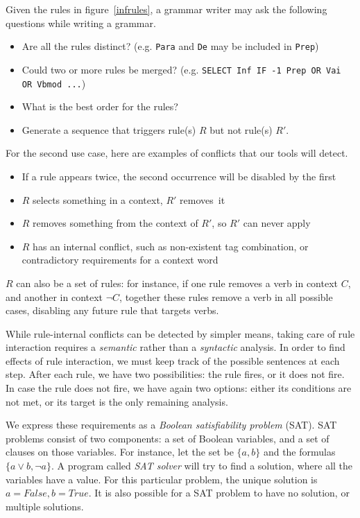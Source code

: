 Given the rules in figure~\ref{infrules}, a grammar writer may ask the following questions while writing a grammar. 

\begin{itemize}
\item Are all the rules distinct? (e.g. \texttt{Para} and \texttt{De} may be included in \texttt{Prep})
\item Could two or more rules be merged? (e.g. \texttt{SELECT Inf IF -1 Prep OR Vai OR Vbmod ...})
\item What is the best order for the rules?
\item Generate a sequence that triggers rule(s) $R$ but not rule(s) $R'$. 
\end{itemize}


For the second use case, here are examples of conflicts that our tools will detect.
\begin{itemize}
\item If a rule appears twice, the second occurrence will be disabled by the first
\item $R$ selects something in a context, $R'$ removes~it
\item $R$ removes something from the context of $R'$, so $R'$ can never
  apply
\item $R$ has an internal conflict, such as non-existent
tag combination, or contradictory requirements for a context word
\end{itemize}
$R$ can also be a set of rules: for instance, if one rule removes a verb in
context $C$, and another in context $\neg C$, together these rules
remove a verb in all possible cases, disabling any future rule that
targets verbs.

While rule-internal conflicts can be detected by simpler means, taking
care of rule interaction requires a {\em semantic} rather than a {\em
 syntactic} analysis.
In order to find effects of rule interaction, we must keep track of
the possible sentences at each step. After each rule, we have two
possibilities: the rule fires, or it does not fire. In case the rule does
not fire, we have again two options: either its conditions are not met,
or its target is the only remaining analysis. 

We express these requirements as a \emph{Boolean satisfiability problem} (SAT).
SAT problems consist of two components: a set of Boolean variables, and a set
of clauses on those variables. For instance, let the set be $\{a,b\}$
and the formulas $\{a \vee b, \neg{}a\}$. A program called \emph{SAT
  solver} will try to find a solution, where all the variables have a
value. For this particular problem, the unique solution is $a=False,
b=True$. It is also possible for a SAT problem to have no solution, or
multiple solutions.





